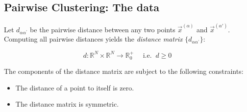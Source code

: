 

\begin{frame}
\section{Pairwise Clustering: The data}


Let $d_{\alpha \alpha^{'}}$ be the pairwise distance between any two points $\vec x^{(\alpha)}$ and $\vec x^{(\alpha')}$. Computing all pairwise distances yields the \emph{distance matrix} $\big\{ d_{\alpha \alpha^{'}} \big\}$:

\begin{equation}
\label{eq:pairwisedistdef}
d: \mathbb{R}^N \times \mathbb{R}^N 
    \rightarrow \mathbb{R}_0^+ \quad\text{ i.e.}\;\; d \ge 0
\end{equation}

The components of the distance matrix are subject to the following constraints:
\begin{itemize}
\item The distance of a point to itself is zero.
\item The distance matrix is symmetric.
\end{itemize}

\end{frame}
